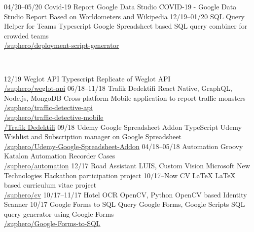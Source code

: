 \documentclass[]{friggeri-cv} %
\begin{document}
\begin{entrylist}

\entry
{04/20--05/20}
{Covid-19 Report}
{Google Data Studio}
{COVID-19 - Google Data Studio Report Based on  \href{https://www.worldometers.info/coronavirus}{Worldometers} and \href{https://en.wikipedia.org/wiki/COVID-19_pandemic}{Wikipedia}}
\entry
{12/19--01/20}
{SQL Query Helper for Teams}
{Typescript}
{Google Spreadsheet based SQL query combiner for crowded teams
\\\href{https://github.com/suphero/deployment-script-generator}{\faGithub/suphero/deployment-script-generator}}
\end{entrylist}
\\
\begin{entrylist}
\entry
{12/19}
{Weglot API}
{Typescript}
{Replicate of Weglot API
\\\href{https://github.com/suphero/weglot-api}{\faGithub/suphero/weglot-api}}
\entry
{06/18--11/18}
{Trafik Dedektifi}
{React Native, GraphQL, Node.js, MongoDB}
{Cross-platform Mobile application to report traffic monsters
\\\href{https://github.com/suphero/traffic-detective-api}{\faGithub/suphero/traffic-detective-api}
\\\href{https://github.com/suphero/traffic-detective-mobile}{\faGithub/suphero/traffic-detective-mobile}
\\\href{https://play.google.com/store/apps/details?id=com.harunsokullu.trafficdetective}{\faAndroid/Trafik Dedektifi}}
\entry
{09/18}
{Udemy Google Spreadsheet Addon}
{TypeScript}
{Udemy Wishlist and Subscription manager on Google Spreadsheet
\\\href{https://github.com/suphero/Udemy-Google-Spreadsheet-Addon}{\faGithub/suphero/Udemy-Google-Spreadsheet-Addon}}
\entry
{04/18--05/18}
{Automation}
{Groovy}
{Katalon Automation Recorder Cases
\\\href{https://github.com/suphero/automation}{\faGithub/suphero/automation}}
\entry
{12/17}
{Road Assistant}
{LUIS, Custom Vision}
{Microsoft New Technologies Hackathon participation project}
\entry
{10/17--Now}
{CV}
{\LaTeX}
{LaTeX based curriculum vitae project
\\\href{https://github.com/suphero/cv}{\faGithub/suphero/cv}}
\entry
{10/17--11/17}
{Hotel OCR}
{OpenCV, Python}
{OpenCV based Identity Scanner}
\entry
{10/17}
{Google Forms to SQL Query}
{Google Forms, Google Scripts}
{SQL query generator using Google Forms
\\\href{https://github.com/suphero/Google-Forms-to-SQL}{\faGithub/suphero/Google-Forms-to-SQL}}

\end{entrylist}
\end{document}
